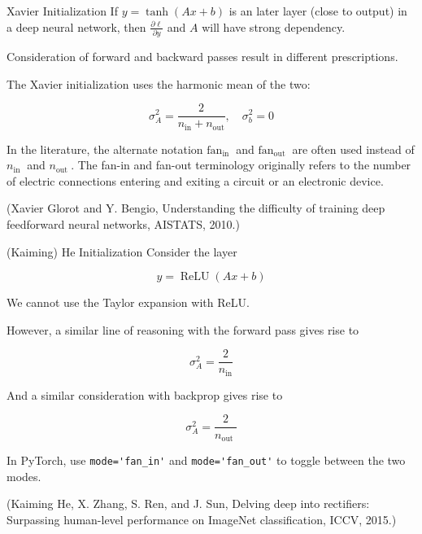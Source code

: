 \begin{frame}[allowframebreaks]
\begin{mydefinitionblock}{6.33}{Xavier Initialization}
    If $y=\tanh (A x+b)$ is an later layer (close to output) in a deep neural network, then $\frac{\partial \ell}{\partial y}$ and $A$ will have strong dependency.

    \par\noindent\textcolor{gray}{\hdashrule{\textwidth}{0.4pt}{1pt 2pt}}

    Consideration of forward and backward passes result in different prescriptions.

    The Xavier initialization uses the harmonic mean of the two:

    $$
    \sigma_{A}^{2}=\frac{2}{n_{\mathrm{in}}+n_{\mathrm{out}}}, \quad \sigma_{b}^{2}=0
    $$

    In the literature, the alternate notation $\text{fan}_{\text {in }}$ and $\text{fan}_{\text {out }}$ are often used instead of $n_{\text {in }}$ and $n_{\text {out }}$. The fan-in and fan-out terminology originally refers to the number of electric connections entering and exiting a circuit or an electronic device.

    (Xavier Glorot and Y. Bengio, Understanding the difficulty of training deep feedforward neural networks, AISTATS, 2010.)
\end{mydefinitionblock}

\end{frame}

\begin{frame}[allowframebreaks]

\begin{mydefinitionblock}{6.34}{(Kaiming) He Initialization}
    Consider the layer

    $$
    y=\operatorname{ReLU}(A x+b)
    $$

    We cannot use the Taylor expansion with ReLU.

    However, a similar line of reasoning with the forward pass gives rise to

    $$
    \sigma_{A}^{2}=\frac{2}{n_{\mathrm{in}}}
    $$

    And a similar consideration with backprop gives rise to

    $$
    \sigma_{A}^{2}=\frac{2}{n_{\text {out }}}
    $$

    In PyTorch, use \verb|mode='fan_in'| and \verb|mode='fan_out'| to toggle between the two modes.

    (Kaiming He, X. Zhang, S. Ren, and J. Sun, Delving deep into rectifiers: Surpassing human-level performance on ImageNet classification, ICCV, 2015.)
\end{mydefinitionblock}

\end{frame}

